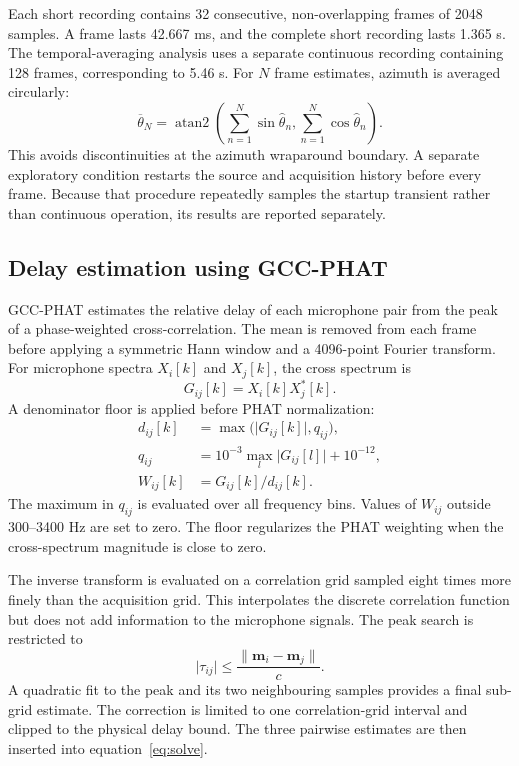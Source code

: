 \documentclass{edpsci}
\begin{document}
Each short recording contains 32 consecutive, non-overlapping frames of 2048 samples. A frame lasts 42.667 ms, and the complete short recording lasts 1.365 s. The temporal-averaging analysis uses a separate continuous recording containing 128 frames, corresponding to 5.46 s. For $N$ frame estimates, azimuth is averaged circularly:
\begin{equation}
	\overline{\theta}_N
	=
	\operatorname{atan2}
	\left(
	\sum_{n=1}^{N}\sin\widehat{\theta}_n,
	\sum_{n=1}^{N}\cos\widehat{\theta}_n
	\right).
\end{equation}
This avoids discontinuities at the azimuth wraparound boundary. A separate exploratory condition restarts the source and acquisition history before every frame. Because that procedure repeatedly samples the startup transient rather than continuous operation, its results are reported separately.

\subsection{Delay estimation using GCC-PHAT}

GCC-PHAT estimates the relative delay of each microphone pair from the peak of a phase-weighted cross-correlation. The mean is removed from each frame before applying a symmetric Hann window and a 4096-point Fourier transform. For microphone spectra $X_i[k]$ and $X_j[k]$, the cross spectrum is
\begin{equation}
	G_{ij}[k]=X_i[k]X_j^*[k].
\end{equation}
A denominator floor is applied before PHAT normalization:
\begin{align}
	d_{ij}[k]
	&=
	\max\bigl(\lvert G_{ij}[k]\rvert,q_{ij}\bigr),\\
	q_{ij}
	&=
	10^{-3}\max_l\lvert G_{ij}[l]\rvert+10^{-12},\\
	W_{ij}[k]
	&=
	G_{ij}[k]/d_{ij}[k].
\end{align}
The maximum in $q_{ij}$ is evaluated over all frequency bins. Values of $W_{ij}$ outside 300--3400 Hz are set to zero. The floor regularizes the PHAT weighting when the cross-spectrum magnitude is close to zero.

The inverse transform is evaluated on a correlation grid sampled eight times more finely than the acquisition grid. This interpolates the discrete correlation function but does not add information to the microphone signals. The peak search is restricted to
\begin{equation}
	\lvert\tau_{ij}\rvert
	\leq
	\frac{\lVert\mathbf{m}_i-\mathbf{m}_j\rVert}{c}.
\end{equation}
A quadratic fit to the peak and its two neighbouring samples provides a final sub-grid estimate. The correction is limited to one correlation-grid interval and clipped to the physical delay bound. The three pairwise estimates are then inserted into equation~\ref{eq:solve}.
\end{document}

